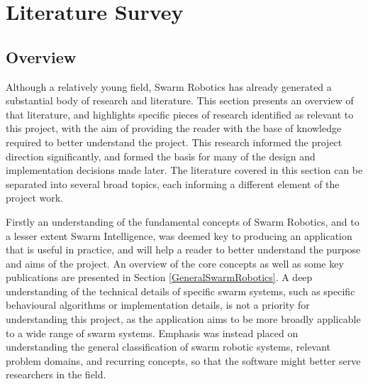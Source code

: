 
\chapter[Literature Survey]{Literature Survey} %

\label{Chapter2} %





\section{Overview}
Although a relatively young field, Swarm Robotics has already generated a substantial body of research and literature. This section presents an overview of that literature, and highlights specific pieces of research identified as relevant to this project, with the aim of providing the reader with the base of knowledge required to better understand the project. This research informed the project direction significantly, and formed the basis for many of the design and implementation decisions made later. The literature covered in this section can be separated into several broad topics, each informing a different element of the project work. 

Firstly an understanding of the fundamental concepts of Swarm Robotics, and to a lesser extent Swarm Intelligence, was deemed key to producing an application that is useful in practice, and will help a reader to better understand the purpose and aims of the project. An overview of the core concepts as well as some key publications are presented in Section \ref{GeneralSwarmRobotics}. A deep understanding of the technical details of specific swarm systems, such as specific behavioural algorithms or implementation details, is not a priority for understanding this project, as the application aims to be more broadly applicable to a wide range of swarm systems. Emphasis was instead placed on understanding the general classification of swarm robotic systems, relevant problem domains, and recurring concepts, so that the software might better serve researchers in the field.

